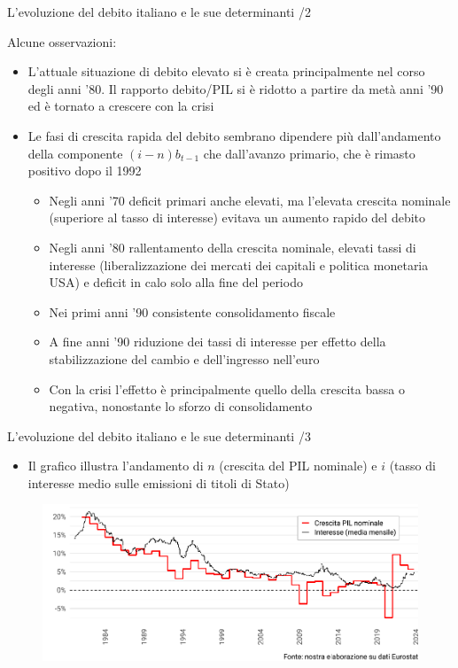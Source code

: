 \documentclass[aspectratio=64,11pt]{beamer}
\begin{document}
\begin{frame}{L'evoluzione del debito italiano e le sue determinanti /2}

  Alcune osservazioni:
  \begin{itemize}
  \item L'attuale situazione di debito elevato si è creata principalmente nel
    corso degli anni '80. Il rapporto debito/PIL si è ridotto a partire da
    metà anni '90 ed è tornato a crescere con la crisi
  \item Le fasi di crescita rapida del debito sembrano dipendere più
    dall'andamento della componente $(i-n)b_{t-1}$ che dall'avanzo primario,
    che è rimasto positivo dopo il 1992
    \begin{itemize}
    \item Negli anni '70 deficit primari anche elevati, ma l'elevata crescita
      nominale (superiore al tasso di interesse) evitava un aumento rapido del
      debito
    \item Negli anni '80 rallentamento della crescita nominale, elevati tassi
      di interesse (liberalizzazione dei mercati dei capitali e politica
      monetaria USA) e deficit in calo solo alla fine del periodo
    \item Nei primi anni '90 consistente consolidamento fiscale
    \item A fine anni '90 riduzione dei tassi di interesse per effetto della
      stabilizzazione del cambio e dell'ingresso nell'euro
    \item Con la crisi l'effetto è principalmente quello della crescita bassa
      o negativa, nonostante lo sforzo di consolidamento
    \end{itemize}
  \end{itemize}
\end{frame}

\begin{frame}{L'evoluzione del debito italiano e le sue determinanti /3}

  \begin{itemize}
  \item Il grafico illustra l'andamento di $n$ (crescita del PIL nominale) e
    $i$ (tasso di interesse medio sulle emissioni di titoli di Stato)
  \end{itemize}

  \begin{figure}
    \centering
    \includegraphics[width=\textwidth]{./figure/interesse-crescita-Italy-color.pdf}
  \end{figure}
\end{frame}
\end{document}
